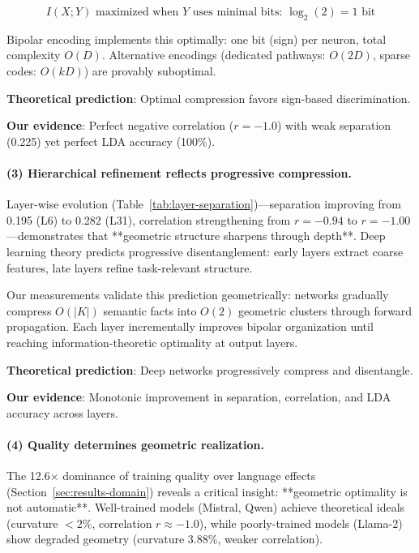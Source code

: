 \documentclass[11pt]{article}
\begin{document}
\begin{equation}
I(X; Y) \text{ maximized when } Y \text{ uses minimal bits: } \log_2(2) = 1 \text{ bit}
\end{equation}

Bipolar encoding implements this optimally: one bit (sign) per neuron, total complexity $O(D)$. Alternative encodings (dedicated pathways: $O(2D)$, sparse codes: $O(kD)$) are provably suboptimal.

\textbf{Theoretical prediction}: Optimal compression favors sign-based discrimination.

\textbf{Our evidence}: Perfect negative correlation ($r=-1.0$) with weak separation (0.225) yet perfect LDA accuracy (100\%).

\paragraph{(3) Hierarchical refinement reflects progressive compression.}
Layer-wise evolution (Table~\ref{tab:layer-separation})—separation improving from 0.195 (L6) to 0.282 (L31), correlation strengthening from $r=-0.94$ to $r=-1.00$—demonstrates that **geometric structure sharpens through depth**. Deep learning theory \citep{saxe2019information} predicts progressive disentanglement: early layers extract coarse features, late layers refine task-relevant structure.

Our measurements validate this prediction geometrically: networks gradually compress $O(|K|)$ semantic facts into $O(2)$ geometric clusters through forward propagation. Each layer incrementally improves bipolar organization until reaching information-theoretic optimality at output layers.

\textbf{Theoretical prediction}: Deep networks progressively compress and disentangle.

\textbf{Our evidence}: Monotonic improvement in separation, correlation, and LDA accuracy across layers.

\paragraph{(4) Quality determines geometric realization.}
The 12.6× dominance of training quality over language effects (Section~\ref{sec:results-domain}) reveals a critical insight: **geometric optimality is not automatic**. Well-trained models (Mistral, Qwen) achieve theoretical ideals (curvature $<2\%$, correlation $r \approx -1.0$), while poorly-trained models (Llama-2) show degraded geometry (curvature 3.88\%, weaker correlation).
\end{document}
